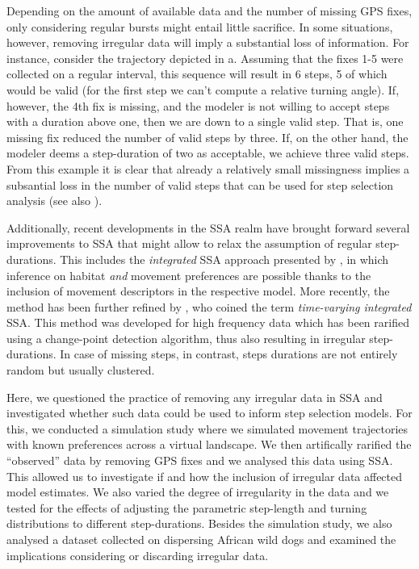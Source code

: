 \documentclass[abstract=on,10pt,a4paper,bibliography=totocnumbered]{article}
\begin{document}
Depending on the amount of available data and the number of missing GPS fixes,
only considering regular bursts might entail little sacrifice. In some
situations, however, removing irregular data will imply a substantial loss of
information. For instance, consider the trajectory depicted in a.
Assuming that the fixes 1-5 were collected on a regular interval, this sequence
will result in 6 steps, 5 of which would be valid (for the first step we can't
compute a relative turning angle). If, however, the 4th fix is missing, and the
modeler is not willing to accept steps with a duration above one, then we are
down to a single valid step. That is, one missing fix reduced the number of
valid steps by three. If, on the other hand, the modeler deems a step-duration
of two as acceptable, we achieve three valid steps. From this example it is
clear that already a relatively small missingness implies a subsantial loss in
the number of valid steps that can be used for step selection analysis (see also
).

Additionally, recent developments in the SSA realm have brought
forward several improvements to SSA that might allow to relax the assumption of
regular step-durations. This includes the \textit{integrated} SSA approach
presented by \citep{Avgar.2016}, in which inference on habitat \textit{and}
movement preferences are possible thanks to the inclusion of movement
descriptors in the respective model. More recently, the method has been further
refined by \citep{Munden.2021}, who coined the term \textit{time-varying
integrated} SSA. This method was developed for high frequency data which has
been rarified using a change-point detection algorithm, thus also resulting in
irregular step-durations. In case of missing steps, in contrast, steps durations
are not entirely random but usually clustered.

Here, we questioned the practice of removing any irregular data in SSA and
investigated whether such data could be used to inform step selection models.
For this, we conducted a simulation study where we simulated movement
trajectories with known preferences across a virtual landscape. We then
artifically rarified the ``observed'' data by removing GPS fixes and we analysed
this data using SSA. This allowed us to investigate if and how the inclusion of
irregular data affected model estimates. We also varied the degree of
irregularity in the data and we tested for the effects of adjusting the
parametric step-length and turning distributions to different step-durations.
Besides the simulation study, we also analysed a dataset collected on dispersing
African wild dogs and examined the implications considering or discarding
irregular data.
\end{document}

